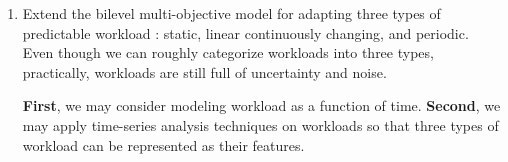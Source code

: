 \begin{enumerate}



	\item Extend the bilevel multi-objective model for adapting three types of predictable workload \cite{Fehling:2014tl}: static, linear continuously changing, and periodic. \\
	
	Even though we can roughly categorize workloads into three types, practically, workloads are still full of uncertainty and noise. 

	 \textbf{First}, we may consider modeling workload as a function of time. \textbf{Second}, we may apply time-series analysis techniques on workloads so that three types of workload can be represented as their features.


\end{enumerate}
